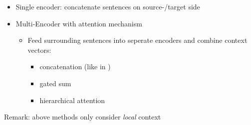 \documentclass[11pt, a4paper, landscape]{article}
\newcommand*{\argmax}{\ensuremath{\operatornamewithlimits{argmax}}\xspace}
\newcommand{\ToDo}[1]{{\footnotesize \color{red}  $\blacktriangleright$ \big[#1\big]}}
\begin{document}
\NewPage
{}
\hypertarget{sec:sota}{}
\vfill
\begin{itemize}
  	\item Single encoder: concatenate sentences on source-/target side \\ \cite{tiedemann_2017,agrawal_2018}
  	\vspace*{1cm}
  	\item Multi-Encoder with attention mechanism
  	\begin{itemize}
  		\item Feed surrounding sentences into seperate encoders and combine context vectors:
  		\begin{itemize}
  			\item concatenation (like in \cite{zoph_2016})
  			\item gated sum \cite{bawden_2018}
  			\item hierarchical attention \cite{bawden_2018}
  		\end{itemize}
  	\end{itemize}
\end{itemize}
\vspace*{2cm}
Remark: above methods only consider \emph{local} context
\vfill



\end{document}
